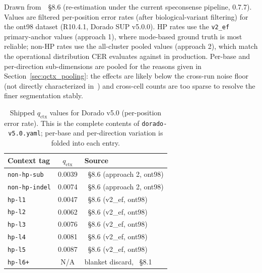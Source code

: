 \documentclass[11pt]{article}
\begin{document}
Drawn from~\cite{hp_paper}~\S 8.6 (re-estimation under the current
speconsense pipeline, 0.7.7). Values are filtered per-position error rates
(after biological-variant filtering) for the ont98 dataset (R10.4.1, Dorado
SUP v5.0.0). HP rates use the \texttt{v2\_ef} primary-anchor values
(approach 1), where mode-based ground truth is most reliable; non-HP rates
use the all-cluster pooled values (approach 2), which match the operational
distribution CER evaluates against in production. Per-base and per-direction
sub-dimensions are pooled for the reasons given in
Section~\ref{sec:qctx_pooling}: the effects are likely below the cross-run
noise floor (not directly characterized in~\cite{hp_paper}) and cross-cell
counts are too sparse to resolve the finer segmentation stably.

\begin{table}[htbp]
\centering
\caption{Shipped $q_\text{ctx}$ values for Dorado v5.0 (per-position error
rate). This is the complete contents of \texttt{dorado-v5.0.yaml}; per-base
and per-direction variation is folded into each entry.}
\label{tab:default_qctx}
\small
\begin{tabular}{lcl}
\toprule
Context tag & $q_\text{ctx}$ & Source \\
\midrule
\texttt{non-hp-sub}            & 0.0039 & \cite{hp_paper}~\S 8.6 (approach 2, ont98) \\
\texttt{non-hp-indel}          & 0.0074 & \cite{hp_paper}~\S 8.6 (approach 2, ont98) \\
\midrule
\texttt{hp-l1}                 & 0.0047 & \cite{hp_paper}~\S 8.6 (v2\_ef, ont98) \\
\texttt{hp-l2}                 & 0.0062 & \cite{hp_paper}~\S 8.6 (v2\_ef, ont98) \\
\texttt{hp-l3}                 & 0.0076 & \cite{hp_paper}~\S 8.6 (v2\_ef, ont98) \\
\texttt{hp-l4}                 & 0.0081 & \cite{hp_paper}~\S 8.6 (v2\_ef, ont98) \\
\texttt{hp-l5}                 & 0.0087 & \cite{hp_paper}~\S 8.6 (v2\_ef, ont98) \\
\midrule
\texttt{hp-l6+}                & N/A    & blanket discard, \cite{hp_paper}~\S 8.1 \\
\bottomrule
\end{tabular}
\end{table}
\end{document}
